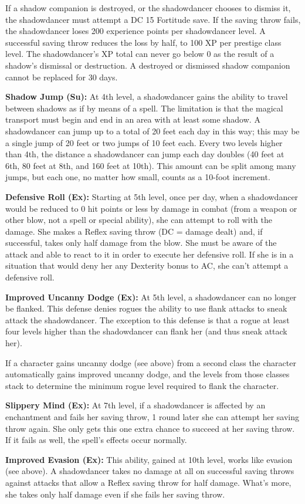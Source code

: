 If a shadow companion is destroyed, or the shadowdancer chooses to dismiss it, 
the shadowdancer must attempt a DC 15 Fortitude save. If the saving throw fails, 
the shadowdancer loses 200 experience points per shadowdancer level. A successful 
saving throw reduces the loss by half, to 100 XP per prestige class level. The 
shadowdancer's XP total can never go below 0 as the result of a shadow's dismissal 
or destruction. A destroyed or dismissed shadow companion cannot be replaced for 
30 days.

\textbf{Shadow Jump (Su):} At 4th level, a shadowdancer gains the ability to travel 
between shadows as if by means of a  spell. The limitation 
is that the magical transport must begin and end in an area with at least some 
shadow. A shadowdancer can jump up to a total of 20 feet each day in this way; 
this may be a single jump of 20 feet or two jumps of 10 feet each. Every two levels 
higher than 4th, the distance a shadowdancer can jump each day doubles (40 feet 
at 6th, 80 feet at 8th, and 160 feet at 10th). This amount can be split among many 
jumps, but each one, no matter how small, counts as a 10-foot increment.

\textbf{Defensive Roll (Ex):} Starting at 5th level, once per day, when a shadowdancer 
would be reduced to 0 hit points or less by damage in combat (from a weapon or 
other blow, not a spell or special ability), she can attempt to roll with the damage. 
She makes a Reflex saving throw (DC = damage dealt) and, if successful, takes only 
half damage from the blow. She must be aware of the attack and able to react to 
it in order to execute her defensive roll. If she is in a situation that would 
deny her any Dexterity bonus to AC, she can't attempt a defensive roll.

\textbf{Improved Uncanny Dodge (Ex):} At 5th level, a shadowdancer can no longer 
be flanked. This defense denies rogues the ability to use flank attacks to sneak 
attack the shadowdancer. The exception to this defense is that a rogue at least 
four levels higher than the shadowdancer can flank her (and thus sneak attack her).

If a character gains uncanny dodge (see above) from a second class the character 
automatically gains improved uncanny dodge, and the levels from those classes stack 
to determine the minimum rogue level required to flank the character.

\textbf{Slippery Mind (Ex):} At 7th level, if a shadowdancer is affected by an 
enchantment and fails her saving throw, 1 round later she can attempt her saving 
throw again. She only gets this one extra chance to succeed at her saving throw. 
If it fails as well, the spell's effects occur normally.

\textbf{Improved Evasion (Ex):} This ability, gained at 10th level, works like 
evasion (see above). A shadowdancer takes no damage at all on successful saving 
throws against attacks that allow a Reflex saving throw for half damage. What's 
more, she takes only half damage even if she fails her saving throw.
